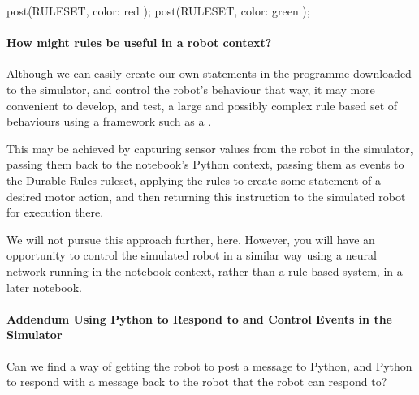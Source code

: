 \documentclass[letterpaper,10pt,english]{sphinxmanual}
\begin{document}
{
\begin{sphinxVerbatim}[commandchars=\\\{\}]
\llap{\color{nbsphinxin}[ ]:\,\hspace{\fboxrule}\hspace{\fboxsep}}post(RULESET, \PYGZob{}\PYGZsq{}color\PYGZsq{}: \PYGZsq{}red\PYGZsq{} \PYGZcb{});
post(RULESET, \PYGZob{}\PYGZsq{}color\PYGZsq{}: \PYGZsq{}green\PYGZsq{} \PYGZcb{});
\end{sphinxVerbatim}
}


\paragraph{How might rules be useful in a robot context?}
\label{\detokenize{content/03_Robot_Lab/Section_00_04:How-might-rules-be-useful-in-a-robot-context?}}
Although we can easily create our own  statements in the programme downloaded to the simulator, and control the robot’s behaviour that way, it may more convenient to develop, and test, a large and possibly complex rule based set of behaviours using a framework such as a .

This may be achieved by capturing sensor values from the robot in the simulator, passing them back to the notebook’s Python context, passing them as events to the Durable Rules ruleset, applying the rules to create some statement of a desired motor action, and then returning this instruction to the simulated robot for execution there.

We will not pursue this approach further, here. However, you will have an opportunity to control the simulated robot in a similar way using a neural network running in the notebook context, rather than a rule based system, in a later notebook.


\paragraph{Addendum \sphinxhyphen{} Using Python to Respond to and Control Events in the Simulator}
\label{\detokenize{content/03_Robot_Lab/Section_00_04:Addendum---Using-Python-to-Respond-to-and-Control-Events-in-the-Simulator}}

Can we find a way of getting the robot to post a message to Python, and Python to respond with a message back to the robot that the robot can respond to?
\end{document}
